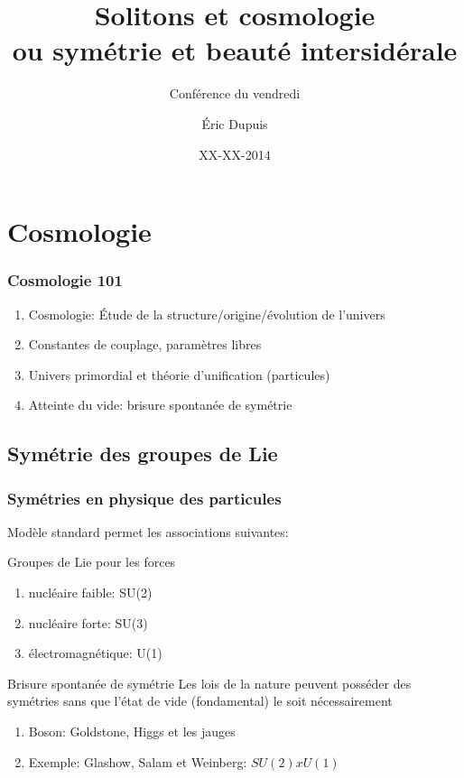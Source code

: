 \documentclass[handout]{beamer}
\title{Solitons et cosmologie\\ ou symétrie et beauté intersidérale}
\subtitle{Conférence du vendredi}
\author{Éric Dupuis}
\institute{Université de Montréal, département de physique des particules}
\date{XX-XX-2014}
\begin{document}
\begin{frame}
\titlepage
\end{frame}
%

\section*{}
\begin{frame}
\tableofcontents
\end{frame}



\section{Cosmologie}

\begin{frame}
\frametitle{Cosmologie 101}
\begin{enumerate}
\item Cosmologie: Étude de la structure/origine/évolution de l'univers
\item Constantes de couplage, paramètres libres
\item Univers primordial et théorie d'unification (particules)
\item Atteinte du vide: brisure spontanée de symétrie
\end{enumerate}
\end{frame}

\subsection{Symétrie des groupes de Lie}
\begin{frame}
\frametitle{Symétries en physique des particules}
Modèle standard permet les associations suivantes:
\begin{block}{Groupes de Lie pour les forces}
\begin{enumerate}
\item nucléaire faible: SU(2)
\item nucléaire forte: SU(3)
\item électromagnétique: U(1)
\end{enumerate}
\end{block}
\begin{block}{Brisure spontanée de symétrie}
Les lois de la nature peuvent posséder des symétries sans que l'état de vide (fondamental) le soit nécessairement
\begin{enumerate}
\item Boson: Goldstone, Higgs et les jauges
\item Exemple: Glashow, Salam et Weinberg: $SU(2)xU(1)$ 
\end{enumerate}
\end{block}
\end{frame}
\end{document}
